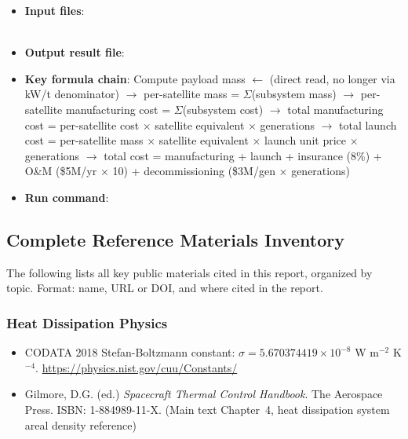 \begin{itemize}
  \item \textbf{Input files}:\\
    \\
  \item \textbf{Output result file}:\\
  \item \textbf{Key formula chain}: Compute payload mass $\gets$  (direct read, no longer via kW/t denominator) $\to$ per-satellite mass = $\Sigma$(subsystem mass) $\to$ per-satellite manufacturing cost = $\Sigma$(subsystem cost) $\to$ total manufacturing cost = per-satellite cost $\times$ satellite equivalent $\times$ generations $\to$ total launch cost = per-satellite mass $\times$ satellite equivalent $\times$ launch unit price $\times$ generations $\to$ total cost = manufacturing + launch + insurance (8\%) + O\&M (\$5M/yr $\times$ 10) + decommissioning (\$3M/gen $\times$ generations)
  \item \textbf{Run command}: 
\end{itemize}

\begingroup
\small
\sloppy
\subsection{Complete Reference Materials Inventory}
\label{sec:full-references}

The following lists all key public materials cited in this report, organized by topic. Format: name, URL or DOI, and where cited in the report.

\subsubsection{Heat Dissipation Physics}

\begin{itemize}
  \item CODATA 2018 Stefan-Boltzmann constant: $\sigma = 5.670374419 \times 10^{-8}$ W m$^{-2}$ K$^{-4}$. \url{https://physics.nist.gov/cuu/Constants/}
  \item Gilmore, D.G. (ed.) \textit{Spacecraft Thermal Control Handbook}. The Aerospace Press. ISBN: 1-884989-11-X. (Main text Chapter~4, heat dissipation system areal density reference)
\end{itemize}

